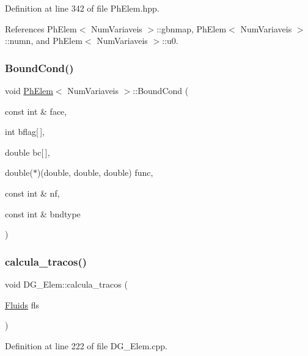 Definition at line 342 of file Ph\+Elem.\+hpp.



References Ph\+Elem$<$ Num\+Variaveis $>$\+::gbnmap, Ph\+Elem$<$ Num\+Variaveis $>$\+::numn, and Ph\+Elem$<$ Num\+Variaveis $>$\+::u0.

\mbox{\label{classPhElem_a61311993fa273240a94044c599d52857}} 
\subsubsection{\texorpdfstring{Bound\+Cond()}{BoundCond()}}
{\footnotesize\ttfamily void \hyperlink{classPhElem}{Ph\+Elem}$<$ Num\+Variaveis $>$\+::Bound\+Cond (\begin{DoxyParamCaption}\item[{const int \&}]{face,  }\item[{int}]{bflag\mbox{[}$\,$\mbox{]},  }\item[{double}]{bc\mbox{[}$\,$\mbox{]},  }\item[{double($\ast$)(double, double, double)}]{func,  }\item[{const int \&}]{nf,  }\item[{const int \&}]{bndtype }\end{DoxyParamCaption})\hspace{0.3cm}{\ttfamily [inherited]}}

\mbox{\label{classDG__Elem_a64d352e6b9eeeeca73368a9ef92a94c2}} 
\subsubsection{\texorpdfstring{calcula\+\_\+tracos()}{calcula\_tracos()}}
{\footnotesize\ttfamily void D\+G\+\_\+\+Elem\+::calcula\+\_\+tracos (\begin{DoxyParamCaption}\item[{\hyperlink{classFluids}{Fluids}}]{fls }\end{DoxyParamCaption})}



Definition at line 222 of file D\+G\+\_\+\+Elem.\+cpp.



